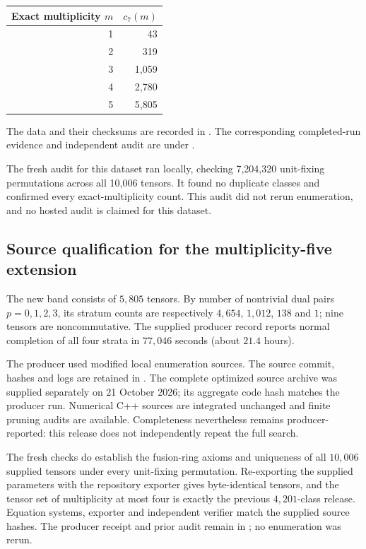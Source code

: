 \documentclass[11pt,a4paper]{article}
\theoremstyle{definition}\newtheorem{definition}[theorem]{Definition}\newtheorem{remark}[theorem]{Remark}
\newcommand{\Rank}{7}
\begin{document}
\begin{center}\begin{tabular}{rr}\toprule Exact multiplicity $m$ & $c_{\Rank}(m)$\\\midrule
1 & 43\\
2 & 319\\
3 & 1,059\\
4 & 2,780\\
5 & 5,805\\
\bottomrule\end{tabular}\end{center}

The data and their checksums are recorded in . The corresponding completed-run evidence and independent audit are under .

The fresh audit for this dataset ran locally, checking 7,204,320 unit-fixing permutations across all 10,006 tensors. It found no duplicate classes and confirmed every exact-multiplicity count. This audit did not rerun enumeration, and no hosted audit is claimed for this dataset.

\subsection{Source qualification for the multiplicity-five extension}
The new band consists of $5,805$ tensors. By number of nontrivial dual pairs
$p=0,1,2,3$, its stratum counts are respectively $4,654$, $1,012$, $138$ and $1$;
nine tensors are noncommutative. The supplied producer record reports normal
completion of all four strata in $77,046$ seconds (about $21.4$ hours).

The producer used modified local enumeration sources. The source commit,
hashes and logs are retained in . The complete optimized source archive was supplied separately
on 21 October 2026; its aggregate code hash matches the producer run. Numerical
C++ sources are integrated unchanged and finite pruning audits are available.
Completeness nevertheless remains producer-reported: this release does not
independently repeat the full search.

The fresh checks do establish the fusion-ring axioms and uniqueness of all
$10,006$ supplied tensors under every unit-fixing permutation. Re-exporting
the supplied parameters with the repository exporter gives byte-identical
tensors, and the tensor set of multiplicity at most four is exactly the
previous $4,201$-class release. Equation systems, exporter and independent
verifier match the supplied source hashes. The producer receipt and prior
audit remain in ; no enumeration was rerun.
\end{document}
